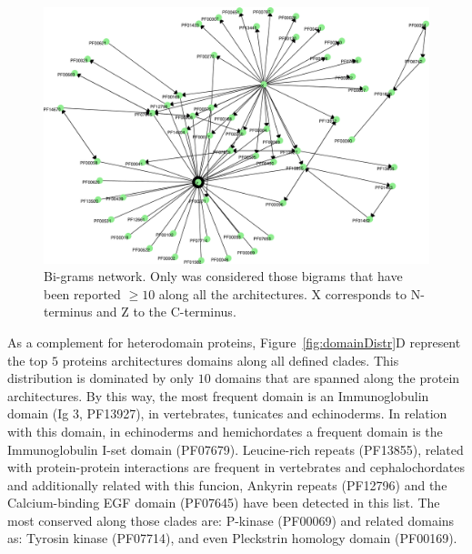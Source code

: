 \documentclass[11pt]{article}
\newcommand{\TODO}[1]{\begingroup\color{red}#1\endgroup}
\begin{document}
\begin{figure}[ht!]
  \centering
  \includegraphics[scale=0.4]{figures/network_10_bigrams}
  \caption{Bi-grams network. Only was considered those bigrams that
  have been reported $\geq 10$ along all the architectures.
  X corresponds to N-terminus and Z to the C-terminus.}\label{fig:bigramNet}
\end{figure}



As a complement for heterodomain proteins, Figure~\ref{fig:domainDistr}D 
represent the top $5$ proteins architectures domains along all defined clades. 
This distribution is dominated by only $10$ domains that are spanned along 
the protein architectures. By this way, the most frequent domain is an 
Immunoglobulin domain (Ig 3, PF13927), in vertebrates, tunicates and 
echinoderms. In relation with this domain, in echinoderms and hemichordates a 
frequent domain is the Immunoglobulin I-set domain (PF07679). Leucine-rich 
repeats (PF13855), related with protein-protein interactions are frequent in 
vertebrates and cephalochordates and additionally related with this funcion, 
Ankyrin repeats (PF12796) and the Calcium-binding EGF domain (PF07645) have 
been detected in this list. The most conserved along those clades are: P-kinase 
(PF00069) and related domains as: Tyrosin kinase (PF07714), and even Pleckstrin 
homology domain (PF00169). 
\end{document}
